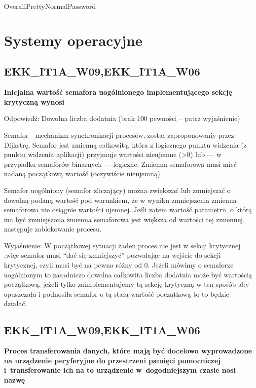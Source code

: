 OverallPrettyNormalPassword
\chapter{Systemy operacyjne}
\PartialToc
\section{EKK\_IT1A\_W09,EKK\_IT1A\_W06}
\textbf{Inicjalna wartość semafora uogólnionego implementującego sekcję krytyczną wynosi}

\vspace{0.4cm}

Odpowiedź: Dowolna liczba dodatnia (brak 100 pewności -- patrz wyjaśnienie)

Semafor - mechanizm synchronizacji procesów, został zaproponowaniy przez Dijkstrę.
Semafor jest zmienną całkowitą, która z logicznego punktu widzenia (z punktu widzenia aplikacji) przyjmuje wartości nieujemne (>0) lub — w przypadku semaforów binarnych — logiczne. Zmienna semaforowa musi mieć nadaną początkową wartość (oczywiście nieujemną).

Semafor uogólniony (semafor zliczający) można zwiększać lub zmniejszać o dowolną podaną wartość pod warunkiem, że w wyniku zmniejszenia zmienna semaforowa nie osiągnie wartości ujemnej. Jeśli zatem wartość parametru, o którą ma być zmniejszona zmienna semaforowa jest większa od wartości tej zmiennej, następuje zablokowanie procesu.

Wyjaśnienie: W początkowej sytuacji żaden proces nie jest w sekcji krytycznej ,więc semafor musi “dać się zmniejszyć” pozwalając na wejście do sekcji krytycznej, czyli musi być na pewno różny od 0. Jeżeli mówimy o semaforze uogólnionym to zasadniczo dowolna całkowita liczba dodatnia może być wartością początkową, jeżeli tylko zaimplementujemy tą sekcję krytyczną w ten sposób aby opuszczała i podnosiła semafor o tą stałą wartość początkową to to będzie działać.


\section{EKK\_IT1A\_W09,EKK\_IT1A\_W06}
\textbf{Proces transferowania danych, które mają być docelowo wyprowadzone na urządzenie peryferyjne do przestrzeni pamięci pomocniczej i~transferowanie ich na to urządzenie w~dogodniejszym czasie nosi nazwę}

